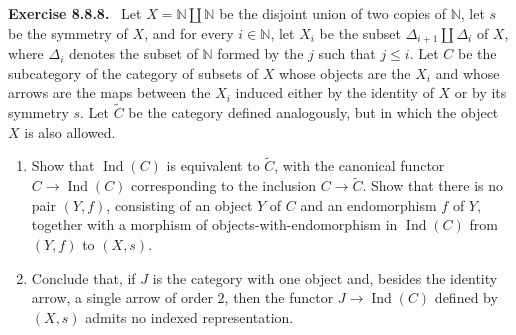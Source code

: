 \documentclass[11pt]{article}
\newcommand{\Ind}{\operatorname{Ind}}
\newcommand{\N}{\mathbb{N}}
\newenvironment{statement}[1]{\par\medskip\noindent\textbf{#1.}\ }{\par\medskip}
\begin{document}
\begin{statement}{Exercise 8.8.8}
Let $X=\N\amalg\N$ be the disjoint union of two copies of $\N$, let $s$ be the symmetry of $X$, and for every $i\in\N$, let $X_i$ be the subset $\Delta_{i+1}\amalg\Delta_i$ of $X$, where $\Delta_i$ denotes the subset of $\N$ formed by the $j$ such that $j\leq i$. Let $C$ be the subcategory of the category of subsets of $X$ whose objects are the $X_i$ and whose arrows are the maps between the $X_i$ induced either by the identity of $X$ or by its symmetry $s$. Let $\widetilde C$ be the category defined analogously, but in which the object $X$ is also allowed.
\begin{enumerate}[label=\alph*)]
\item Show that $\Ind(C)$ is equivalent to $\widetilde C$, with the canonical functor $C\to\Ind(C)$ corresponding to the inclusion $C\to\widetilde C$. Show that there is no pair $(Y,f)$, consisting of an object $Y$ of $C$ and an endomorphism $f$ of $Y$, together with a morphism of objects-with-endomorphism in $\Ind(C)$ from $(Y,f)$ to $(X,s)$.
\item Conclude that, if $J$ is the category with one object and, besides the identity arrow, a single arrow of order $2$, then the functor $J\to\Ind(C)$ defined by $(X,s)$ admits no indexed representation.
\end{enumerate}
\end{statement}
\end{document}
